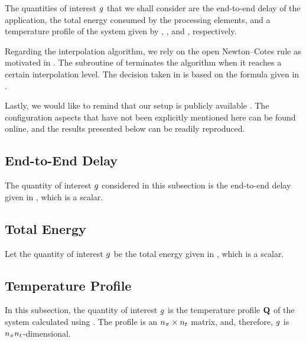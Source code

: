 The quantities of interest $g$ that we shall consider are the end-to-end delay
of the application, the total energy consumed by the processing elements, and a
temperature profile of the system given by ,
, and , respectively.

Regarding the interpolation algorithm, we rely on the open Newton--Cotes rule as
motivated in . The  subroutine of
 terminates the algorithm when it reaches a certain
interpolation level. The decision taken in  is based on the
formula given in .

Lastly, we would like to remind that our setup is publicly available
\cite{sources}. The configuration aspects that have not been explicitly
mentioned here can be found online, and the results presented below can be
readily reproduced.

\subsection{End-to-End Delay}

The quantity of interest $g$ considered in this subsection is the end-to-end
delay given in , which is a scalar.

\subsection{Total Energy}

Let the quantity of interest $g$ be the total energy given in
, which is a scalar.

\subsection{Temperature Profile}

In this subsection, the quantity of interest $g$ is the temperature profile
$\mathbf{Q}$ of the system calculated using . The profile is an
${n_\pi} \times {n_t}$ matrix, and, therefore, $g$ is ${n_\pi} {n_t}$-dimensional.
